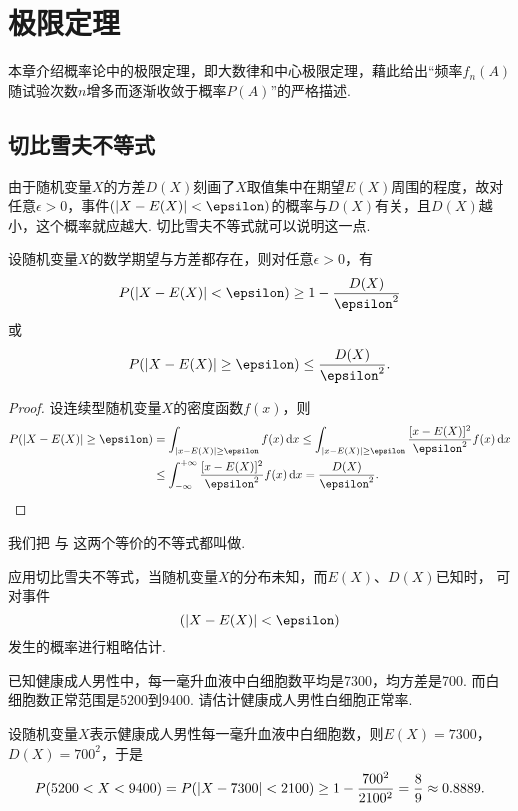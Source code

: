 \chapter{极限定理}
本章介绍概率论中的极限定理，即大数律和中心极限定理，藉此给出“频率\(f_n(A)\)随试验次数\(n\)增多而逐渐收敛于概率\(P(A)\)”的严格描述.

\section{切比雪夫不等式}
由于随机变量\(X\)的方差\(D(X)\)刻画了\(X\)取值集中在期望\(E(X)\)周围的程度，故对任意\(\epsilon>0\)，事件\((\abs{X - E(X)} < \epsilon)\)的概率与\(D(X)\)有关，且\(D(X)\)越小，这个概率就应越大.
切比雪夫不等式就可以说明这一点.
\begin{theorem}[切比雪夫不等式]\label{theorem:极限定理.切比雪夫不等式}
设随机变量\(X\)的数学期望与方差都存在，则对任意\(\epsilon > 0\)，有\begin{equation}\label{equation:极限定理.切比雪夫不等式1}
P(\abs{X-E(X)}<\epsilon) \geq 1 - \frac{D(X)}{\epsilon^2}
\end{equation}或\begin{equation}\label{equation:极限定理.切比雪夫不等式2}
P(\abs{X-E(X)}\geq\epsilon) \leq \frac{D(X)}{\epsilon^2}.
\end{equation}
\begin{proof}
设连续型随机变量\(X\)的密度函数\(f(x)\)，则\begin{align*}
P(\abs{X-E(X)}\geq\epsilon)
&=\int_{\abs{x-E(X)}\geq\epsilon} f(x) \dd{x}
\leq \int_{\abs{x-E(X)}\geq\epsilon} \frac{[x - E(X)]^2}{\epsilon^2} f(x) \dd{x} \\
&\leq \int_{-\infty}^{+\infty} \frac{[x-E(X)]^2}{\epsilon^2} f(x) \dd{x}
=\frac{D(X)}{\epsilon^2}.
\qedhere
\end{align*}
\end{proof}
\end{theorem}

我们把 
与 
这两个等价的不等式都叫做.

应用切比雪夫不等式，当随机变量\(X\)的分布未知，而\(E(X)\)、\(D(X)\)已知时，
可对事件\[
(\abs{X-E(X)}<\epsilon)
\]发生的概率进行粗略估计.

\begin{example}
已知健康成人男性中，每一毫升血液中白细胞数平均是7300，均方差是700.
而白细胞数正常范围是5200到9400.
请估计健康成人男性白细胞正常率.
\begin{solution}
设随机变量\(X\)表示健康成人男性每一毫升血液中白细胞数，则\(E(X) = 7300\)，\(D(X) = 700^2\)，于是\[
P(5200 < X < 9400)
= P(\abs{X - 7300} < 2100)
\geq 1 - \frac{700^2}{2100^2} = \frac{8}{9}
\approx 0.8889.
\]
\end{solution}
\end{example}

